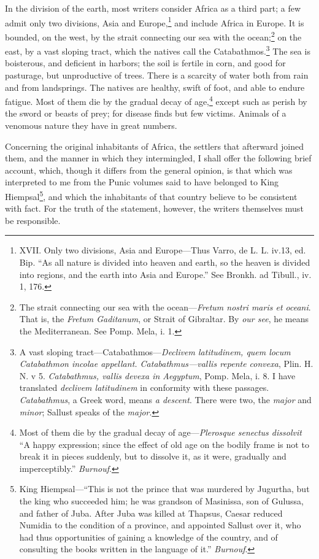 In the division of the earth, most writers consider Africa as a third
part; a few admit only two divisions, Asia and Europe,\footnote{XVII. Only two divisions, Asia and Europe—Thus Varro, de L.
L. iv.13, ed. Bip. ``As all nature is divided into heaven and earth, so
the heaven is divided into regions, and the earth into Asia and
Europe.'' See Bronkh. ad Tibull., iv. 1, 176.} and include
Africa in Europe. It is bounded, on the west, by the strait connecting
our sea with the ocean;\footnote{The strait connecting our sea with the ocean—\emph{Fretum nostri
maris et oceani}. That is, the \emph{Fretum Gaditanum}, or Strait of
Gibraltar. By \emph{our see}, he means the Mediterranean. See Pomp. Mela,
i. 1.} on the east, by a vast sloping tract,
which the natives call the Catabathmos.\footnote{A vast sloping tract—Catabathmos—\emph{Declivem latitudinem,
quem locum Catabathmon incolae appellant. Catabathmus—vallis repente
convexa}, Plin. H. N. v 5. \emph{Catabathmus, vallis devexa in Aegyptum},
Pomp. Mela, i. 8. I have translated \emph{declivem latitudinem} in
conformity with these passages. \emph{Catabathmus}, a Greek word, means \emph{a
descent}. There were two, the \emph{major} and \emph{minor}; Sallust speaks of
the \emph{major}.} The sea is boisterous, and
deficient in harbors; the soil is fertile in corn, and good for
pasturage, but unproductive of trees. There is a scarcity of water
both from rain and from landsprings. The natives are healthy, swift of
foot, and able to endure fatigue. Most of them die by the gradual
decay of age,\footnote{Most of them die by the gradual decay of age—\emph{Plerosque
senectus dissolvit} ``A happy expression; since the effect of old age
on the bodily frame is not to break it in pieces suddenly, but to
dissolve it, as it were, gradually and imperceptibly.'' \emph{Burnouf}.} except such as perish by the sword or beasts of
prey; for disease finds but few victims. Animals of a venomous nature
they have in great numbers.

Concerning the original inhabitants of Africa, the settlers that
afterward joined them, and the manner in which they intermingled, I
shall offer the following brief account, which, though it differs from
the general opinion, is that which was interpreted to me from the Punic
volumes said to have belonged to King Hiempsal\footnote{King Hiempsal—``This is not the prince that was murdered by
Jugurtha, but the king who succeeded him; he was grandson of
Masinissa, son of Gulussa, and father of Juba. After Juba was killed
at Thapsus, Caesar reduced Numidia to the condition of a province, and
appointed Sallust over it, who had thus opportunities of gaining a
knowledge of the country, and of consulting the books written in the
language of it.'' \emph{Burnouf}.}, and which the
inhabitants of that country believe to be consistent with fact. For
the truth of the statement, however, the writers themselves must be
responsible.

